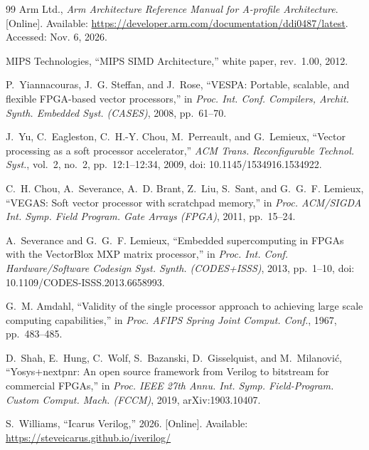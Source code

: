 \documentclass[conference]{IEEEtran}
\begin{document}
\begin{thebibliography}{99}
 Arm Ltd., \emph{Arm Architecture Reference Manual for A-profile
Architecture}. [Online]. Available: \url{https://developer.arm.com/documentation/ddi0487/latest}.
Accessed: Nov. 6, 2026.

 MIPS Technologies, ``MIPS SIMD Architecture,'' white paper, rev.~1.00, 2012.

 P.~Yiannacouras, J.~G. Steffan, and J.~Rose, ``VESPA: Portable,
scalable, and flexible FPGA-based vector processors,'' in \emph{Proc. Int. Conf.
Compilers, Archit. Synth. Embedded Syst. (CASES)}, 2008, pp.~61--70.

 J.~Yu, C.~Eagleston, C.~H.-Y. Chou, M.~Perreault, and G.~Lemieux,
``Vector processing as a soft processor accelerator,'' \emph{ACM Trans.
Reconfigurable Technol. Syst.}, vol.~2, no.~2, pp.~12:1--12:34, 2009,
doi: 10.1145/1534916.1534922.

 C.~H. Chou, A.~Severance, A.~D. Brant, Z.~Liu, S.~Sant, and
G.~G.~F. Lemieux, ``VEGAS: Soft vector processor with scratchpad memory,'' in
\emph{Proc. ACM/SIGDA Int. Symp. Field Program. Gate Arrays (FPGA)}, 2011,
pp.~15--24.

 A.~Severance and G.~G.~F. Lemieux, ``Embedded supercomputing in
FPGAs with the VectorBlox MXP matrix processor,'' in \emph{Proc. Int. Conf.
Hardware/Software Codesign Syst. Synth. (CODES+ISSS)}, 2013, pp.~1--10,
doi: 10.1109/CODES-ISSS.2013.6658993.

 G.~M. Amdahl, ``Validity of the single processor approach to
achieving large scale computing capabilities,'' in \emph{Proc. AFIPS Spring Joint
Comput. Conf.}, 1967, pp.~483--485.

 D.~Shah, E.~Hung, C.~Wolf, S.~Bazanski, D.~Gisselquist, and
M.~Milanovi\'c, ``Yosys+nextpnr: An open source framework from Verilog to bitstream
for commercial FPGAs,'' in \emph{Proc. IEEE 27th Annu. Int. Symp.
Field-Program. Custom Comput. Mach. (FCCM)}, 2019, arXiv:1903.10407.

 S.~Williams, ``Icarus Verilog,'' 2026. [Online]. Available:
\url{https://steveicarus.github.io/iverilog/}

\end{thebibliography}
\end{document}
